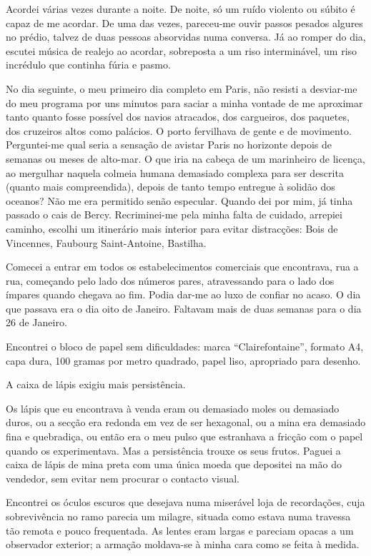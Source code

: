 Acordei várias vezes durante a noite. De noite, só um ruído violento ou
súbito é capaz de me acordar. De uma das vezes, pareceu-me ouvir passos
pesados algures no prédio, talvez de duas pessoas absorvidas numa
conversa. Já ao romper do dia, escutei música de realejo ao acordar,
sobreposta a um riso interminável, um riso incrédulo que continha
fúria e pasmo.

No dia seguinte, o meu primeiro dia completo em Paris, não resisti a
desviar-me do meu programa por uns minutos para saciar a minha vontade
de me aproximar tanto quanto fosse possível dos navios atracados, dos
cargueiros, dos paquetes, dos cruzeiros altos como palácios. O porto
fervilhava de gente e de movimento. Perguntei-me qual seria a sensação
de avistar Paris no horizonte depois de semanas ou meses de alto-mar. O
que iria na cabeça de um marinheiro de licença, ao mergulhar naquela
colmeia humana demasiado complexa para ser descrita (quanto mais
compreendida), depois de tanto tempo entregue à solidão dos oceanos? Não
me era permitido senão especular. Quando dei por mim, já tinha passado
o cais de Bercy. Recriminei-me pela minha falta de cuidado, arrepiei
caminho, escolhi um itinerário mais interior para evitar distracções:
Bois de Vincennes, Faubourg Saint-Antoine, Bastilha.

Comecei a entrar em todos os estabelecimentos comerciais que encontrava,
rua a rua, começando pelo lado dos números pares, atravessando para o
lado dos ímpares quando chegava ao fim. Podia dar-me ao luxo de confiar
no acaso. O dia que
passava era o dia oito de Janeiro. Faltavam mais de duas semanas para
o dia 26 de Janeiro.

Encontrei o bloco de papel sem dificuldades: marca ``Clairefontaine'',
formato A4, capa dura, 100 gramas por metro quadrado, papel liso,
apropriado para desenho.

A caixa de lápis exigiu mais persistência.

Os lápis que eu encontrava à venda eram ou demasiado moles ou demasiado
duros, ou a secção era redonda em vez de ser hexagonal, ou a mina era
demasiado fina e quebradiça, ou então era o meu pulso que estranhava a
fricção com o papel quando os experimentava. Mas a persistência trouxe
os seus frutos. Paguei a caixa de lápis de mina preta com uma única
moeda que depositei na mão do vendedor, sem evitar nem procurar o
contacto visual.

Encontrei os óculos escuros que desejava numa miserável loja de
recordações, cuja sobrevivência no ramo parecia um milagre, situada como
estava numa travessa tão remota e pouco frequentada. As lentes eram
largas e pareciam opacas a um observador exterior; a armação moldava-se
à minha cara como se feita à medida.

